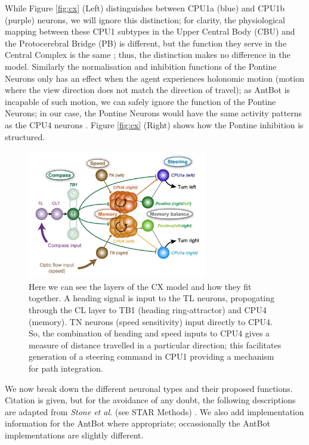 \documentclass[a4paper,11pt,twoside,openright]{article}
\begin{document}
While Figure \ref{fig:cx} (Left) distinguishes between CPU1a (blue) and
CPU1b (purple) neurons, we will ignore this distinction; for clarity, the
physiological mapping between these CPU1 subtypes in the Upper Central Body (CBU)
and the Protocerebral Bridge (PB) is different, but the function they serve in
the Central Complex is the same \cite{Stone2017}; thus, the distinction makes
no difference in the model. Similarly the normalisation and inhibition functions
of the Pontine Neurons only has an effect when the agent experiences holonomic
motion (motion where the view direction does not match the direction of travel);
as AntBot is incapable of such motion, we can safely ignore the function of
the Pontine Neurons; in our case, the Pontine Neurons would have the
same activity patterns as the CPU4 neurons \cite{Stone2017}. Figure \ref{fig:cx}
(Right) shows how the Pontine inhibition is structured.
\newline
\par

\begin{figure}[h!]
  \centering
  \includegraphics[width=0.7\textwidth]{Figure5F}
  \caption{
    \label{fig:cxlayer} Here we can see the layers of the CX model and
    how they fit together. A heading signal is input to the TL neurons,
    propogating through the CL layer to TB1 (heading ring-attractor) and
    CPU4 (memory). TN neurons (speed sensitivity) input directly to CPU4.
    So, the combination of heading and speed inputs to CPU4 gives a measure
    of distance travelled in a particular direction; this facilitates generation
    of a steering command in CPU1 providing a mechanism for path integration.
  }
\end{figure}

We now break down the different neuronal types and their proposed functions.
Citation is given, but for the avoidance of any doubt, the following descriptions
are adapted from \textit{Stone et al.} (see STAR Methods) \cite{Stone2017}.
We also add implementation information for the AntBot where appropriate;
occassionally the AntBot implementations are slightly different.
\newline
\par
\end{document}
